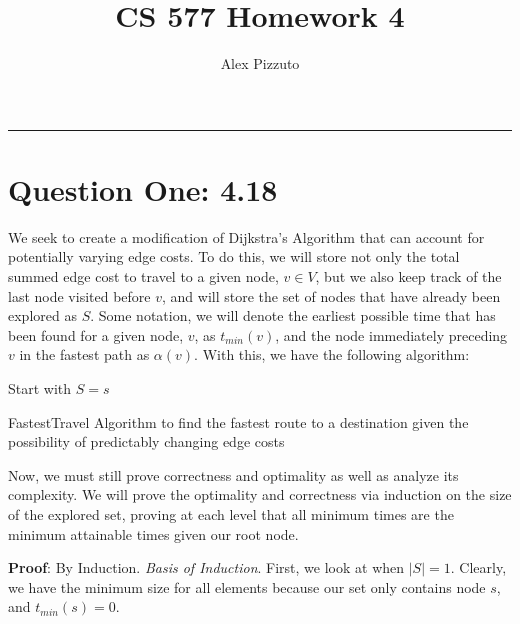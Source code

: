\documentclass[11pt,letterpaper]{article}
\author{Alex Pizzuto}
\title{CS 577 Homework 4}
\begin{document}
\date{}
\maketitle
\hrule

\section*{Question One: 4.18}
We seek to create a modification of Dijkstra's Algorithm that can account for potentially varying edge costs. To do this, we will store not only the total summed edge cost to travel to a given node, $v \in V$, but we also keep track of the last node visited before $v$, and will store the set of nodes that have already been explored as $S$. Some notation, we will denote the earliest possible time that has been found for a given node, $v$, as $t_{min}(v)$, and the node immediately preceding $v$ in the fastest path as $\alpha(v)$. With this, we have the following algorithm: 
\begin{algorithm}[H]
	Start with $S = s$\;
	\caption{FastestTravel Algorithm to find the fastest route to a destination given the possibility of predictably changing edge costs}
\end{algorithm}

Now, we must still prove correctness and optimality as well as analyze its complexity. We will prove the optimality and correctness via induction on the size of the explored set, proving at each level that all minimum times are the minimum attainable times given our root node.

\textbf{Proof}: By Induction. \textit{Basis of Induction}. First, we look at when $|S| = 1$. Clearly, we have the minimum size for all elements because our set only contains node $s$, and $t_{min}(s) = 0$. 
\end{document}
